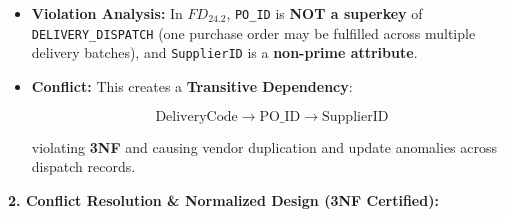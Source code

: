\documentclass[a4paper,12pt]{report}
\begin{document}
\begin{itemize}
  \begin{itemize}
  \item
    \textbf{Violation Analysis:} In \(FD_{24.2}\), \texttt{PO\_\allowbreak{}ID} is \textbf{NOT a superkey} of \texttt{DELIVERY\_\allowbreak{}DISPATCH} (one purchase order may be fulfilled across multiple delivery batches), and \texttt{SupplierID} is a \textbf{non-prime attribute}.
  \item
    \textbf{Conflict:} This creates a \textbf{Transitive Dependency}:

    \[\text{DeliveryCode} \rightarrow \text{PO\_ID} \rightarrow \text{SupplierID}\]

    violating \textbf{3NF} and causing vendor duplication and update anomalies across dispatch records.
  \end{itemize}
\end{itemize}

\textbf{2. Conflict Resolution \& Normalized Design (3NF Certified):}
\end{document}
